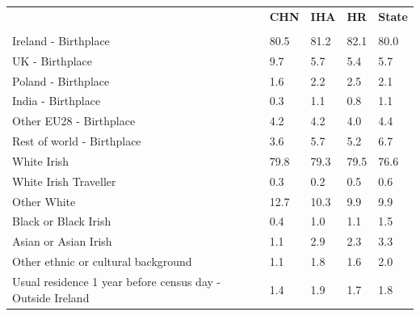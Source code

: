 \documentclass{article}
\begin{document}
\pagebreak
\begin{table}[h]	
\centering
		\begin{tabular}{KTTTT}
  \hline
& \textbf{CHN} & \textbf{IHA} & \textbf{HR}& \textbf{State}\\ 
  \hline
    \\ 
    \hline
Ireland - Birthplace & 80.5& 81.2& 82.1& 80.0\\
UK - Birthplace & 9.7& 5.7& 5.4& 5.7\\
Poland - Birthplace & 1.6& 2.2& 2.5& 2.1\\
India - Birthplace & 0.3& 1.1& 0.8& 1.1\\
Other EU28 - Birthplace & 4.2& 4.2& 4.0& 4.4\\
Rest of world - Birthplace & 3.6& 5.7& 5.2& 6.7\\
    \hline
White Irish & 79.8& 79.3& 79.5& 76.6\\
White Irish Traveller & 0.3& 0.2& 0.5& 0.6\\
Other White & 12.7& 10.3&  9.9&  9.9\\
Black or Black Irish & 0.4& 1.0& 1.1& 1.5\\
Asian or Asian Irish & 1.1& 2.9& 2.3& 3.3\\
Other ethnic or cultural background & 1.1& 1.8& 1.6& 2.0\\
    \hline
Usual residence 1 year before census day - Outside Ireland & 1.4& 1.9& 1.7& 1.8\\


\end{tabular}
\end{table}
\end{document}
